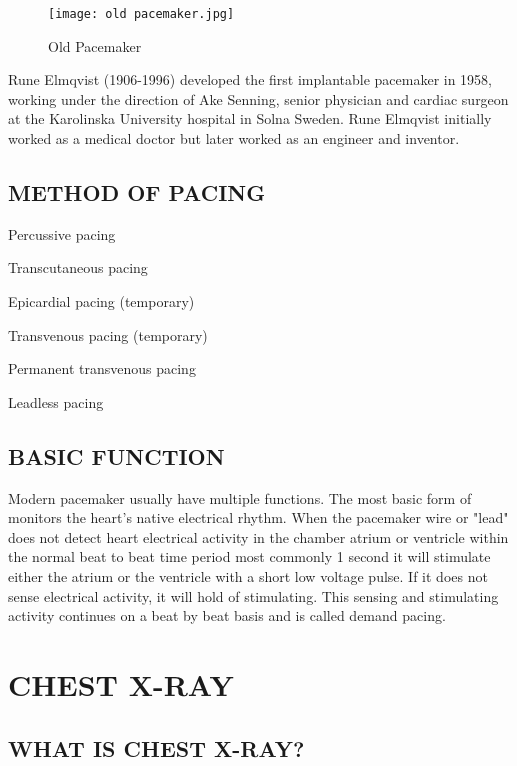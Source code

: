\documentclass[12pt]{article}
\begin{document}
\begin{figure}[h]
\centering
\texttt{[image: old pacemaker.jpg]}
\caption{Old Pacemaker}
\end{figure}


{\large Rune Elmqvist (1906-1996) developed the first implantable pacemaker in 1958, working under the direction of Ake Senning, senior physician and cardiac surgeon at the Karolinska University hospital in Solna Sweden. Rune Elmqvist initially worked as a medical doctor but later worked as an engineer and inventor.}




\subsection{METHOD OF PACING}


\begin{itemize}
{\large \item Percussive pacing
\item Transcutaneous pacing
\item Epicardial pacing (temporary)
\item Transvenous pacing (temporary)
\item Permanent transvenous pacing
\item Leadless pacing}
\end{itemize}


\subsection{BASIC FUNCTION}


{\large Modern pacemaker usually have multiple functions. The most basic form of monitors the heart's native electrical rhythm. When the pacemaker wire or "lead" does not detect heart electrical activity in the chamber atrium or ventricle within the normal beat to beat time period most commonly 1 second it will stimulate either the atrium or the ventricle with a short low voltage pulse. If it does not sense electrical activity, it will hold of stimulating. This sensing and stimulating activity continues on a beat by beat basis and is called demand pacing.}




\section{CHEST X-RAY}



\subsection{WHAT IS CHEST X-RAY?}
\end{document}

